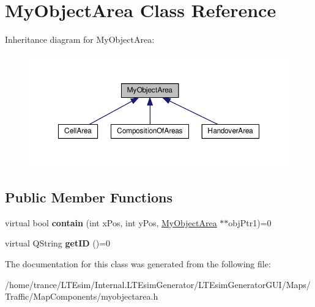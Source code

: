 \hypertarget{class_my_object_area}{}\section{My\+Object\+Area Class Reference}
\label{class_my_object_area}


Inheritance diagram for My\+Object\+Area\+:
\nopagebreak
\begin{figure}[H]
\begin{center}
\leavevmode
\includegraphics[width=350pt]{class_my_object_area__inherit__graph}
\end{center}
\end{figure}
\subsection*{Public Member Functions}
\begin{DoxyCompactItemize}
\item 
virtual bool {\bfseries contain} (int x\+Pos, int y\+Pos, \hyperlink{class_my_object_area}{My\+Object\+Area} $\ast$$\ast$obj\+Ptr1)=0\hypertarget{class_my_object_area_a7c6aedc23cc85f6d3ae8ce7cacbd3e12}{}\label{class_my_object_area_a7c6aedc23cc85f6d3ae8ce7cacbd3e12}

\item 
virtual Q\+String {\bfseries get\+ID} ()=0\hypertarget{class_my_object_area_ad6bede4aa9eb5ed8721cde5547f906bd}{}\label{class_my_object_area_ad6bede4aa9eb5ed8721cde5547f906bd}

\end{DoxyCompactItemize}


The documentation for this class was generated from the following file\+:\begin{DoxyCompactItemize}
\item 
/home/trance/\+L\+T\+Esim/\+Internal.\+L\+T\+Esim\+Generator/\+L\+T\+Esim\+Generator\+G\+U\+I/\+Maps/\+Traffic/\+Map\+Components/myobjectarea.\+h\end{DoxyCompactItemize}
